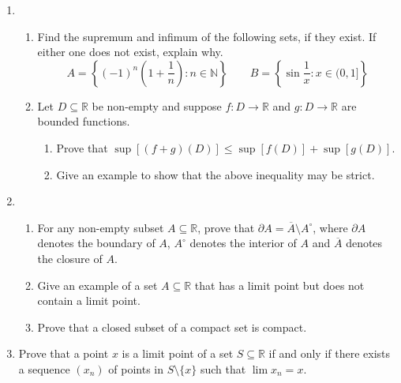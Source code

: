 \documentclass[12pt]{article}
\newcommand{\points}[1]{\marginpar{\hspace{24pt}[#1]}}
\newcommand{\R}{\mathbb{R}}
\newcommand{\N}{\mathbb{N}}
\begin{document}
\begin{enumerate}
\item \begin{enumerate}
       \item Find the supremum and infimum of the following sets, if they exist. If either one does not exist, explain why.\points{4}
\[
 A = \left\{(-1)^n\left(1+\frac{1}{n}\right):n\in\N\right\} \quad \quad B = \left\{\sin \frac{1}{x} : x\in (0,1]\right\}
\]

\vspace{3in}

\item Let $D\subseteq \R$ be non-empty and suppose $f:D\to\R$ and $g:D\to \R$ are bounded functions.
\begin{enumerate}
 \item Prove that $\sup[(f+g)(D)] \leq \sup[f(D)]+\sup[g(D)]$. \points{4}

\vspace{2.5in}

 \item Give an example to show that the above inequality may be strict. \points{2}
\end{enumerate}

      \end{enumerate}
\newpage
\item \begin{enumerate}
       \item For any non-empty subset $A\subseteq \R$, prove that $\partial A = \overline{A}\setminus A^\circ$, where $\partial A$ denotes the boundary of $A$, $A^\circ$ denotes the interior of $A$ and $\overline{A}$ denotes the closure of $A$. \points{5}

\vspace{3.5in}

       \item Give an example of a set $A\subseteq \R$ that has a limit point but does not contain a limit point. \points{2}

\vspace{1.5in}

       \item Prove that a closed subset of a compact set is compact. \points{3}
      \end{enumerate}
\newpage

\item Prove that a point $x$ is a limit point of a set $S\subseteq \R$ if and only if there exists a sequence $(x_n)$ of points in $S\setminus \{x\}$ such that $\lim x_n = x$. \points{10}


\end{enumerate}
\end{document}
